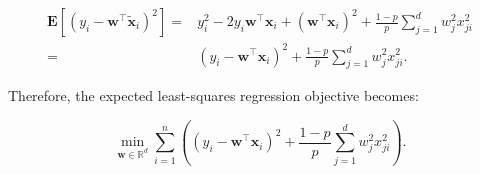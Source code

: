 \documentclass[10pt]{article}
\newcommand{\wv}{\mathbf{w}}
\newcommand{\xv}{\mathbf{x}}
\newcommand{\RR}{\mathds{R}}
\begin{document}
\begin{exercise}
\begin{enumerate}
		      $$
			      \begin{aligned}
				      \mathbf{E}[(y_i - \wv^\top \tilde{\xv}_i)^2]
				      = & y_i^2 - 2 y_i \wv^\top \xv_i + (\wv^\top \xv_i)^2 + \frac{1-p}{p}\sum_{j=1}^d w_j^2 x_{ji}^2 \\
				      = & (y_i-\wv^\top \xv_i)^2 + \frac{1-p}{p}\sum_{j=1}^d w_j^2 x_{ji}^2.
			      \end{aligned}
		      $$

		      Therefore, the expected least-squares regression objective becomes:

		      $$
			      \boxed{\min_{\wv \in \RR^d} \sum_{i=1}^n\left(  (y_i-\wv^\top \xv_i)^2 + \frac{1-p}{p}\sum_{j=1}^d w_j^2 x_{ji}^2 \right)}.
		      $$
	\end{enumerate}
\end{exercise}
\end{document}
